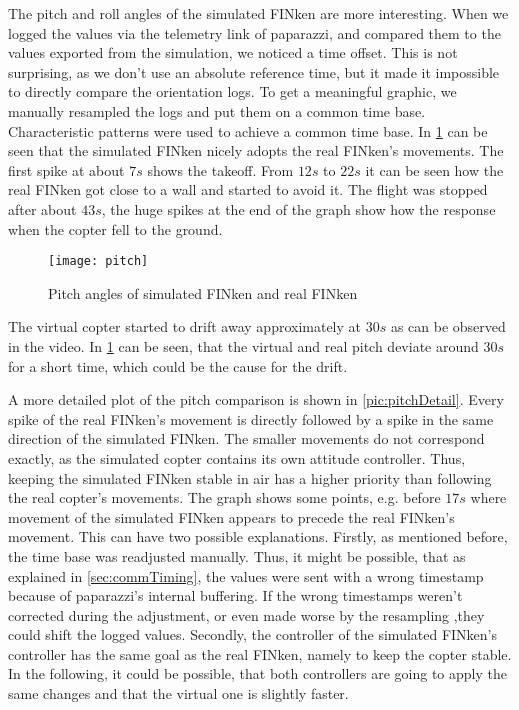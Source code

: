 The pitch and roll angles of the simulated FINken are more interesting.
When we logged the values via the telemetry link of paparazzi, and compared them to the values exported from the simulation, we noticed a time offset. 
This is not surprising, as we don't use an absolute reference time, but it made it impossible to directly compare the orientation logs.
To get a meaningful graphic, we manually resampled the logs and put them on a common time base.
Characteristic patterns were used to achieve a common time base.
In \ref{pic:pitchResponse} can be seen that the simulated FINken nicely adopts the real FINken's movements. 
The first spike at about $7s$ shows the takeoff. 
From $12s$ to $22s$ it can be seen how the real FINken got close to a wall and started to avoid it. 
The flight was stopped after about $43s$, the huge spikes at the end of the graph show how the response when the copter fell to the ground.
\begin{figure}
	\begin{center}
	\texttt{[image: pitch]}
	\caption{Pitch angles of simulated FINken and real FINken}
	\label{pic:pitchResponse}
	\end{center}
\end{figure}

The virtual copter started to drift away approximately at $30s$ as can be observed in the video.
In \ref{pic:pitchResponse} can be seen, that the virtual and real pitch deviate around $30s$ for a short time, which could be the cause for the drift.

A more detailed plot of the pitch comparison is shown in \ref{pic:pitchDetail}.
Every spike of the real FINken's movement is directly followed by a spike in the same direction of the simulated FINken.
The smaller movements do not correspond exactly, as the simulated copter contains its own attitude controller.
Thus, keeping the simulated FINken stable in air has a higher priority than following the real copter's movements.
The graph shows some points, e.g. before $17s$ where movement of the simulated FINken appears to precede the real FINken's movement.
This can have two possible explanations.
Firstly, as mentioned before, the time base was readjusted manually.
Thus, it might be possible, that as explained in \ref{sec:commTiming}, the values were sent with a wrong timestamp because of paparazzi's internal buffering.
If the wrong timestamps weren't corrected during the adjustment, or even made worse by the resampling ,they could shift the logged values.
Secondly,  the controller of the simulated FINken's controller has the same goal as the real FINken, namely to keep the copter stable. 
In the following, it could be possible, that both controllers are going to apply the same changes and that the virtual one is slightly faster.
 

